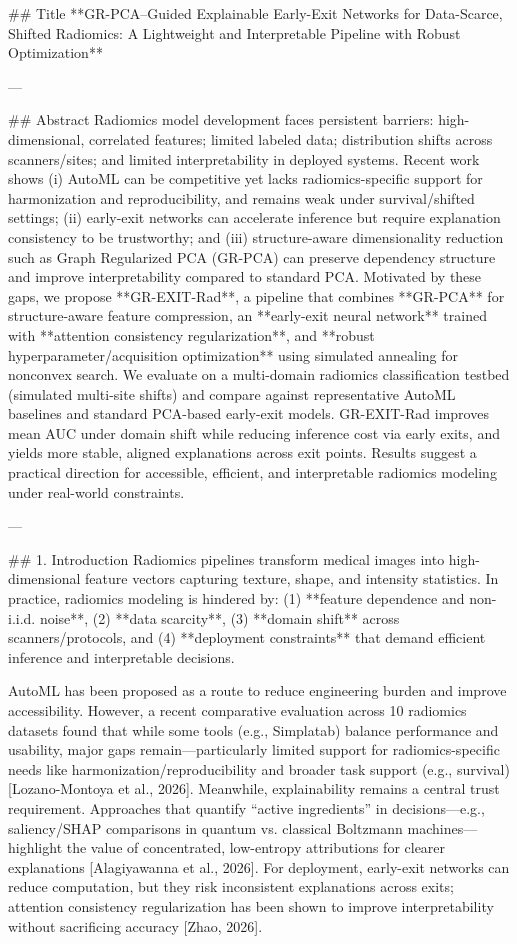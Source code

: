 ## Title
**GR-PCA–Guided Explainable Early-Exit Networks for Data-Scarce, Shifted Radiomics: A Lightweight and Interpretable Pipeline with Robust Optimization**

---

## Abstract
Radiomics model development faces persistent barriers: high-dimensional, correlated features; limited labeled data; distribution shifts across scanners/sites; and limited interpretability in deployed systems. Recent work shows (i) AutoML can be competitive yet lacks radiomics-specific support for harmonization and reproducibility, and remains weak under survival/shifted settings; (ii) early-exit networks can accelerate inference but require explanation consistency to be trustworthy; and (iii) structure-aware dimensionality reduction such as Graph Regularized PCA (GR-PCA) can preserve dependency structure and improve interpretability compared to standard PCA. Motivated by these gaps, we propose **GR-EXIT-Rad**, a pipeline that combines **GR-PCA** for structure-aware feature compression, an **early-exit neural network** trained with **attention consistency regularization**, and **robust hyperparameter/acquisition optimization** using simulated annealing for nonconvex search. We evaluate on a multi-domain radiomics classification testbed (simulated multi-site shifts) and compare against representative AutoML baselines and standard PCA-based early-exit models. GR-EXIT-Rad improves mean AUC under domain shift while reducing inference cost via early exits, and yields more stable, aligned explanations across exit points. Results suggest a practical direction for accessible, efficient, and interpretable radiomics modeling under real-world constraints.

---

## 1. Introduction
Radiomics pipelines transform medical images into high-dimensional feature vectors capturing texture, shape, and intensity statistics. In practice, radiomics modeling is hindered by: (1) **feature dependence and non-i.i.d. noise**, (2) **data scarcity**, (3) **domain shift** across scanners/protocols, and (4) **deployment constraints** that demand efficient inference and interpretable decisions.

AutoML has been proposed as a route to reduce engineering burden and improve accessibility. However, a recent comparative evaluation across 10 radiomics datasets found that while some tools (e.g., Simplatab) balance performance and usability, major gaps remain—particularly limited support for radiomics-specific needs like harmonization/reproducibility and broader task support (e.g., survival) [Lozano-Montoya et al., 2026]. Meanwhile, explainability remains a central trust requirement. Approaches that quantify “active ingredients” in decisions—e.g., saliency/SHAP comparisons in quantum vs. classical Boltzmann machines—highlight the value of concentrated, low-entropy attributions for clearer explanations [Alagiyawanna et al., 2026]. For deployment, early-exit networks can reduce computation, but they risk inconsistent explanations across exits; attention consistency regularization has been shown to improve interpretability without sacrificing accuracy [Zhao, 2026].

